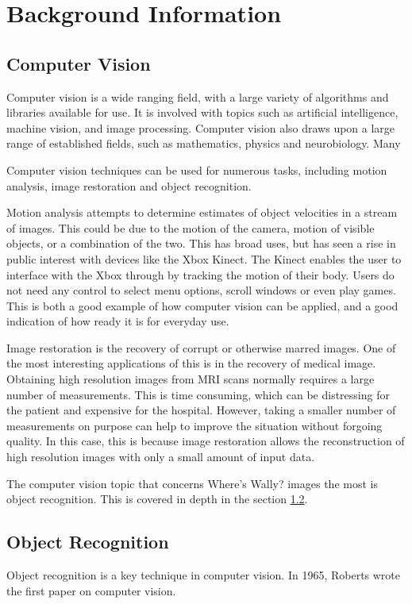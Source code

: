 \documentclass[../main.tex]{subfiles}
\begin{document}
\section{Background Information}
  \subsection{Computer Vision}
    Computer vision is a wide ranging field, with a large variety of algorithms and libraries available for use.
    It is involved with topics such as artificial intelligence\cite{aivis}, machine vision\cite{robovision}, and image processing.
    Computer vision also draws upon a large range of established fields, such as mathematics, physics and neurobiology.
    Many 
    
    Computer vision techniques can be used for numerous tasks, including motion analysis, image restoration and object recognition.

    Motion analysis attempts to determine estimates of object velocities in a stream of images.
    This could be due to the motion of the camera, motion of visible objects, or a combination of the two.
    This has broad uses, but has seen a rise in public interest with devices like the Xbox Kinect\cite{kinect}.
    The Kinect enables the user to interface with the Xbox through by tracking the motion of their body.
    Users do not need any control to select menu options, scroll windows or even play games.
    This is both a good example of how computer vision can be applied, and a good indication of how ready it is for everyday use.

    Image restoration is the recovery of corrupt or otherwise marred images.
    One of the most interesting applications of this is in the recovery of medical image\cite{imagerecovery}.
    Obtaining high resolution images from MRI scans normally requires a large number of measurements.
    This is time consuming, which can be distressing for the patient and expensive for the hospital.
    However, taking a smaller number of measurements on purpose can help to improve the situation without forgoing quality.
    In this case, this is because image restoration allows the reconstruction of high resolution images with only a small amount of input data.
    
    The computer vision topic that concerns Where's Wally? images the most is object recognition.
    This is covered in depth in the section \ref{bkrndobj}.
    
  \subsection{Object Recognition}
    \label{bkrndobj}
    Object recognition is a key technique in computer vision.
    In 1965, Roberts wrote the first paper on computer vision\cite{machine3d}.
  
\end{document}
